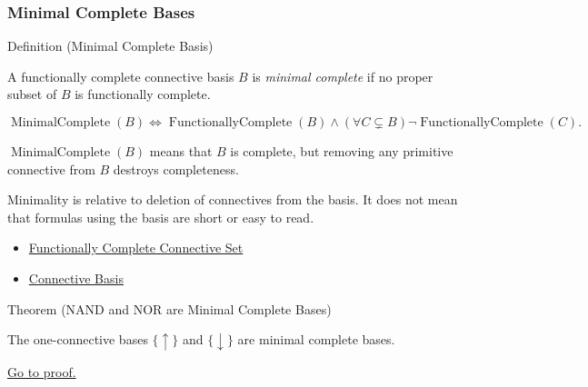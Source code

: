 \subsubsection*{Minimal Complete Bases}

\begin{definitionbox}{Definition (Minimal Complete Basis)}
\begin{definition}
\label{def:minimal-complete-basis-propositional-logic}
A functionally complete connective basis \(B\) is \emph{minimal complete} if no
proper subset of \(B\) is functionally complete.
\end{definition}
\end{definitionbox}

\begin{remark*}
\[
\operatorname{MinimalComplete}(B)
\Longleftrightarrow
\operatorname{FunctionallyComplete}(B)
\land
(\forall C\subsetneq B)\neg\operatorname{FunctionallyComplete}(C).
\]
\end{remark*}

\begin{remark*}
\(\operatorname{MinimalComplete}(B)\) means that \(B\) is complete, but removing
any primitive connective from \(B\) destroys completeness.
\end{remark*}

\begin{remark*}[Interpretation]
Minimality is relative to deletion of connectives from the basis. It does not
mean that formulas using the basis are short or easy to read.
\end{remark*}

\begin{dependencies}
\begin{itemize}
  \item \hyperref[def:functionally-complete-connective-set-propositional-logic]{Functionally Complete Connective Set}
  \item \hyperref[def:connective-basis-propositional-logic]{Connective Basis}
\end{itemize}
\end{dependencies}

\begin{theorembox}{Theorem (NAND and NOR are Minimal Complete Bases)}
\begin{theorem}
\label{thm:nand-nor-minimal-complete-bases-propositional-logic}
The one-connective bases \(\{\uparrow\}\) and \(\{\downarrow\}\) are minimal
complete bases.

\noindent\hyperref[prf:nand-nor-minimal-complete-bases-propositional-logic]{Go to proof.}
\end{theorem}
\end{theorembox}

